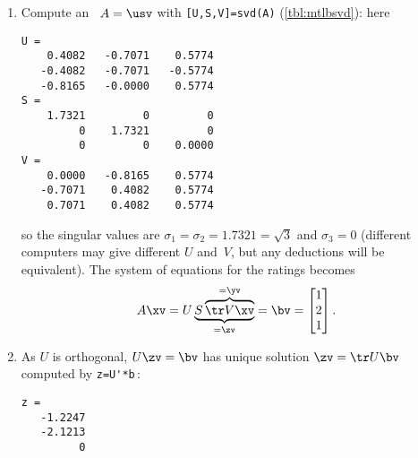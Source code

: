 \begin{example}
\begin{solution}

\begin{enumerate}
\item Compute an \svd\ \(A=\usv\) with \verb|[U,S,V]=svd(A)| (\autoref{tbl:mtlbsvd}): here
\begin{verbatim}
U =
    0.4082   -0.7071    0.5774
   -0.4082   -0.7071   -0.5774
   -0.8165   -0.0000    0.5774
S =
    1.7321         0         0
         0    1.7321         0
         0         0    0.0000
V =
    0.0000   -0.8165    0.5774
   -0.7071    0.4082    0.5774
    0.7071    0.4082    0.5774
\end{verbatim}
so the singular values are \(\sigma_1=\sigma_2=1.7321=\sqrt3\) and \(\sigma_3=0\)
(different computers may give different \(U\) and~\(V\), but any deductions will be equivalent).
The system of equations for the ratings becomes
\begin{equation*}
A\xv=
U\underbrace{S\overbrace{\tr V\xv}^{=\yv}}_{=\zv}
=\bv=\begin{bmatrix} 1\\ 2\\ 1 \end{bmatrix}.
\end{equation*}

\item As \(U\) is orthogonal, \(U\zv=\bv\) has unique solution \(\zv=\tr U\bv\) computed by \verb|z=U'*b|\,:
\begin{verbatim}
z =
   -1.2247
   -2.1213
         0
\end{verbatim}



\end{enumerate}
\end{solution}
\end{example}
